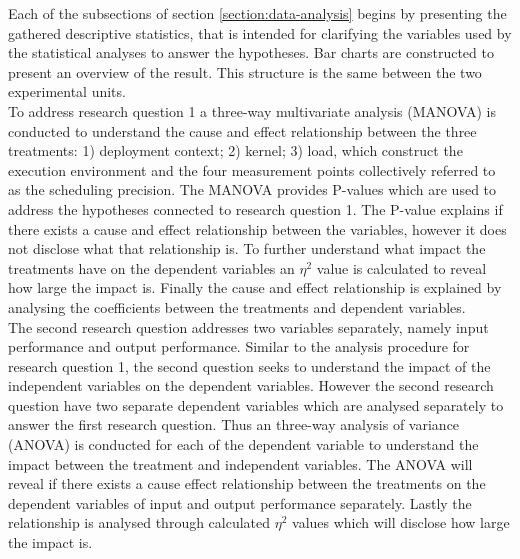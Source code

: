 Each of the subsections of section \ref{section:data-analysis} begins by presenting the gathered descriptive statistics, that is intended for clarifying the variables used by the statistical analyses to answer the hypotheses. Bar charts are constructed to present an overview of the result. This structure is the same between the two experimental units.\\

To address research question 1 a three-way multivariate analysis (MANOVA) is conducted to understand the cause and effect relationship between the three treatments: 1) deployment context; 2) kernel; 3) load, which construct the execution environment and the four measurement points collectively referred to as the scheduling precision. The MANOVA provides P-values which are used to address the hypotheses connected to research question 1. The P-value explains if there exists a cause and effect relationship between the variables, however it does not disclose what that relationship is. To further understand what impact the treatments have on the dependent variables an $\eta^{2}$ value is calculated to reveal how large the impact is. Finally the cause and effect relationship is explained by analysing the coefficients between the treatments and dependent variables.\\

The second research question addresses two variables separately, namely input performance and output performance. Similar to the analysis procedure for research question 1, the second question seeks to understand the impact of the independent variables on the dependent variables. However the second research question have two separate dependent variables which are analysed separately to answer the first research question. Thus an three-way analysis of variance (ANOVA) is conducted for each of the dependent variable to understand the impact between the treatment and independent variables. The ANOVA will reveal if there exists a cause effect relationship between the treatments on the dependent variables of input and output performance separately. Lastly the relationship is analysed through calculated $\eta^{2}$ values which will disclose how large the impact is.\\
